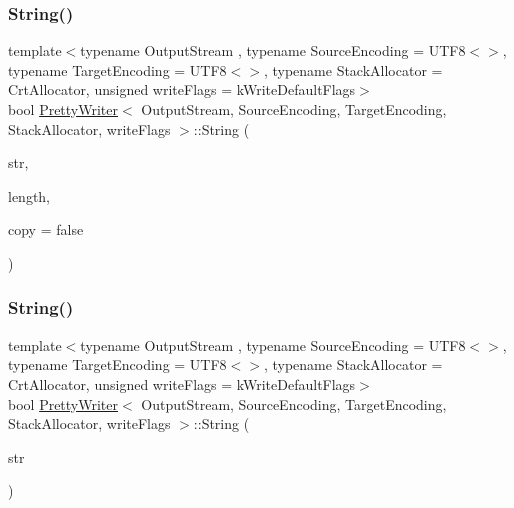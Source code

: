 \mbox{\label{classPrettyWriter_ae544ccfe35dd7e80ed694873062409f6}} 
\subsubsection{\texorpdfstring{String()}{String()}\hspace{0.1cm}{\footnotesize\ttfamily [1/2]}}
{\footnotesize\ttfamily template$<$typename Output\+Stream , typename Source\+Encoding  = U\+T\+F8$<$$>$, typename Target\+Encoding  = U\+T\+F8$<$$>$, typename Stack\+Allocator  = Crt\+Allocator, unsigned write\+Flags = k\+Write\+Default\+Flags$>$ \\
bool \hyperlink{classPrettyWriter}{Pretty\+Writer}$<$ Output\+Stream, Source\+Encoding, Target\+Encoding, Stack\+Allocator, write\+Flags $>$\+::String (\begin{DoxyParamCaption}\item[{const \hyperlink{classPrettyWriter_ae35c89bda4c5d59d3ff6efcf2fea45a3}{Ch} $\ast$}]{str,  }\item[{\hyperlink{rapidjson_8h_a5ed6e6e67250fadbd041127e6386dcb5}{Size\+Type}}]{length,  }\item[{bool}]{copy = {\ttfamily false} }\end{DoxyParamCaption})\hspace{0.3cm}{\ttfamily [inline]}}

\mbox{\label{classPrettyWriter_a7e85689355a827d273f272c26b447225}} 
\subsubsection{\texorpdfstring{String()}{String()}\hspace{0.1cm}{\footnotesize\ttfamily [2/2]}}
{\footnotesize\ttfamily template$<$typename Output\+Stream , typename Source\+Encoding  = U\+T\+F8$<$$>$, typename Target\+Encoding  = U\+T\+F8$<$$>$, typename Stack\+Allocator  = Crt\+Allocator, unsigned write\+Flags = k\+Write\+Default\+Flags$>$ \\
bool \hyperlink{classPrettyWriter}{Pretty\+Writer}$<$ Output\+Stream, Source\+Encoding, Target\+Encoding, Stack\+Allocator, write\+Flags $>$\+::String (\begin{DoxyParamCaption}\item[{const \hyperlink{classPrettyWriter_ae35c89bda4c5d59d3ff6efcf2fea45a3}{Ch} $\ast$}]{str }\end{DoxyParamCaption})\hspace{0.3cm}{\ttfamily [inline]}}



